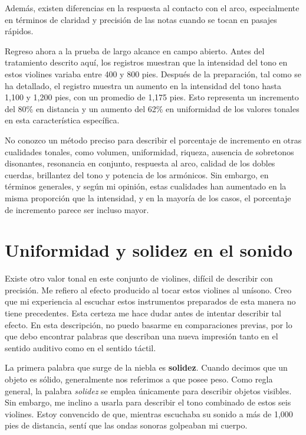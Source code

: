 \documentclass[12pt]{book}
\begin{document}
Además, existen diferencias en la respuesta al contacto con el arco, especialmente en términos de claridad y precisión de las notas cuando se tocan en pasajes rápidos.

Regreso ahora a la prueba de largo alcance en campo abierto. Antes del tratamiento descrito aquí, los registros muestran que la intensidad del tono en estos violines variaba entre 400 y 800 pies. Después de la preparación, tal como se ha detallado, el registro muestra un aumento en la intensidad del tono hasta 1,100 y 1,200 pies, con un promedio de 1,175 pies. Esto representa un incremento del 80\% en distancia y un aumento del 62\% en uniformidad de los valores tonales en esta característica específica.

No conozco un método preciso para describir el porcentaje de incremento en otras cualidades tonales, como volumen, uniformidad, riqueza, ausencia de sobretonos disonantes, resonancia en conjunto, respuesta al arco, calidad de los dobles cuerdas, brillantez del tono y potencia de los armónicos. Sin embargo, en términos generales, y según mi opinión, estas cualidades han aumentado en la misma proporción que la intensidad, y en la mayoría de los casos, el porcentaje de incremento parece ser incluso mayor.

\section*{Uniformidad y solidez en el sonido}

Existe otro valor tonal en este conjunto de violines, difícil de describir con precisión. Me refiero al efecto producido al tocar estos violines al unísono. Creo que mi experiencia al escuchar estos instrumentos preparados de esta manera no tiene precedentes. Esta certeza me hace dudar antes de intentar describir tal efecto. En esta descripción, no puedo basarme en comparaciones previas, por lo que debo encontrar palabras que describan una nueva impresión tanto en el sentido auditivo como en el sentido táctil.

La primera palabra que surge de la niebla es \textbf{solidez}. Cuando decimos que un objeto es sólido, generalmente nos referimos a que posee peso. Como regla general, la palabra \textit{solidez} se emplea únicamente para describir objetos visibles. Sin embargo, me inclino a usarla para describir el tono combinado de estos seis violines. Estoy convencido de que, mientras escuchaba su sonido a más de 1,000 pies de distancia, sentí que las ondas sonoras golpeaban mi cuerpo.
\end{document}
